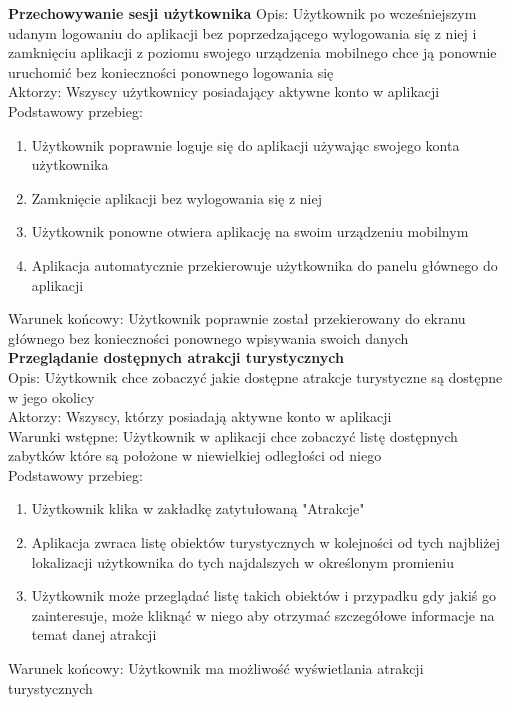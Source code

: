     \textbf{Przechowywanie sesji użytkownika}
        Opis: Użytkownik po wcześniejszym udanym logowaniu do aplikacji bez poprzedzającego wylogowania się z niej i zamknięciu aplikacji z poziomu swojego urządzenia mobilnego chce ją ponownie uruchomić bez konieczności ponownego logowania się \\
        Aktorzy: Wszyscy użytkownicy posiadający aktywne konto w aplikacji \\ 
        Podstawowy przebieg:
        \begin{enumerate}
            \item Użytkownik poprawnie loguje się do aplikacji używając swojego konta użytkownika
            \item Zamknięcie aplikacji bez wylogowania się z niej
            \item Użytkownik ponowne otwiera aplikację na swoim urządzeniu mobilnym
            \item Aplikacja automatycznie przekierowuje użytkownika do panelu głównego do aplikacji
        \end{enumerate}
        Warunek końcowy: Użytkownik poprawnie został przekierowany do ekranu głównego bez konieczności ponownego wpisywania swoich danych \\

    \textbf{Przeglądanie dostępnych atrakcji turystycznych} \\
        Opis: Użytkownik chce zobaczyć jakie dostępne atrakcje turystyczne są dostępne w jego okolicy \\
        Aktorzy: Wszyscy, którzy posiadają aktywne konto w aplikacji \\ 
        Warunki wstępne: Użytkownik w aplikacji chce zobaczyć listę dostępnych zabytków które są położone w niewielkiej odległości od niego \\ 
        Podstawowy przebieg:
        \begin{enumerate}
            \item Użytkownik klika w zakładkę zatytułowaną "Atrakcje"
            \item Aplikacja zwraca listę obiektów turystycznych w kolejności od tych najbliżej lokalizacji użytkownika do tych najdalszych w określonym promieniu
            \item Użytkownik może przeglądać listę takich obiektów i przypadku gdy jakiś go zainteresuje, może kliknąć w niego aby otrzymać szczegółowe informacje na temat danej atrakcji
        \end{enumerate}
        Warunek końcowy: Użytkownik ma możliwość wyświetlania atrakcji turystycznych \\

